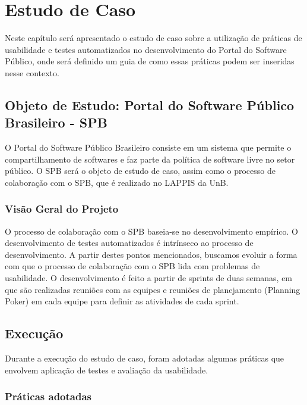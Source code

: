 \chapter{Estudo de Caso}

Neste capítulo será apresentado o estudo de caso sobre a utilização de práticas de usabilidade e testes automatizados no desenvolvimento do Portal do Software Público, onde será definido um guia de como essas práticas podem ser inseridas nesse contexto.

\section{Objeto de Estudo: Portal do Software Público Brasileiro - SPB}

O Portal do Software Público Brasileiro consiste em um sistema que permite o compartilhamento de softwares e faz parte da política de software livre no setor público.
O SPB será o objeto de estudo de caso, assim como o processo de colaboração com o SPB, que é realizado no LAPPIS da UnB.

\subsection{Visão Geral do Projeto}

O processo de colaboração com o SPB baseia-se no desenvolvimento empírico. O desenvolvimento de testes automatizados é intrínseco ao processo de desenvolvimento. A partir destes pontos mencionados, buscamos evoluir a forma com que o processo de colaboração com o SPB lida com problemas de usabilidade.
O desenvolvimento é feito a partir de sprints de duas semanas, em que são realizadas reuniões com as equipes e reuniões de planejamento (Planning Poker) em cada equipe para definir as atividades de cada sprint.



 
\section{Execução}



Durante a execução do estudo de caso, foram adotadas algumas práticas que envolvem aplicação de testes e avaliação da usabilidade.

\subsection{Práticas adotadas}

